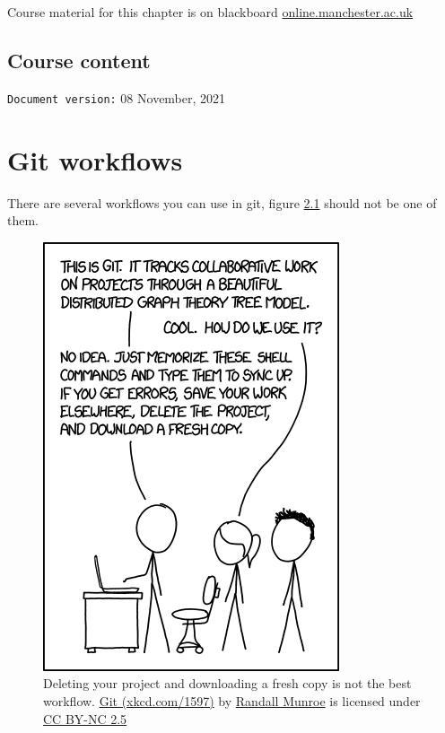 \documentclass[
]{book}
\begin{document}
Course material for this chapter is on blackboard \href{https://online.manchester.ac.uk}{online.manchester.ac.uk}

\hypertarget{course-content-1}{%
\section{Course content}\label{course-content-1}}

\texttt{Document\ version:} 08 November, 2021

\hypertarget{flowing}{%
\chapter{Git workflows}\label{flowing}}

There are several workflows you can use in git, figure \ref{fig:xkcd-git-fig} should not be one of them.

\begin{figure}

{\centering \includegraphics[width=0.55\linewidth]{images/git} 

}

\caption{Deleting your project and downloading a fresh copy is not the best workflow. \href{https://xkcd.com/1597/}{Git (xkcd.com/1597)} by \href{https://en.wikipedia.org/wiki/Randall_Munroe}{Randall Munroe} is licensed under \href{https://creativecommons.org/licenses/by-nc/2.5/}{CC BY-NC 2.5}}\label{fig:xkcd-git-fig}
\end{figure}
\end{document}
